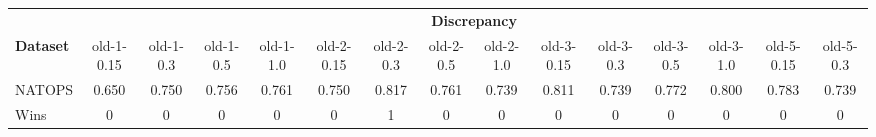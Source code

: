 \begin{tabular}{lcccccccccccccc}
\toprule
{} & \multicolumn{14}{c}{\textbf{Discrepancy}} \\
\textbf{Dataset} &           old-1-0.15 & old-1-0.3 & old-1-0.5 & old-1-1.0 & old-2-0.15 & old-2-0.3 & old-2-0.5 & old-2-1.0 & old-3-0.15 & old-3-0.3 & old-3-0.5 & old-3-1.0 & old-5-0.15 & old-5-0.3 \\
\midrule
NATOPS &                0.650 &     0.750 &     0.756 &     0.761 &      0.750 &     0.817 &     0.761 &     0.739 &      0.811 &     0.739 &     0.772 &     0.800 &      0.783 &     0.739 \\ 
\midrule
Wins &           0 &          0 &          0 &          0 &           0 &          1 &          0 &          0 &           0 &          0 &          0 &          0 &           0 &          0 \\
\bottomrule
\end{tabular}
